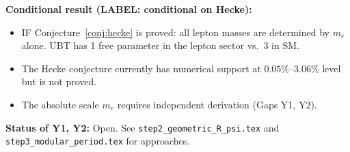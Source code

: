 \documentclass[12pt,a4paper]{article}
\theoremstyle{definition}
\theoremstyle{remark}
\begin{document}
\begin{resultbox}
\textbf{Conditional result (LABEL: conditional on Hecke):}
\begin{itemize}
  \item IF Conjecture~\ref{conj:hecke} is proved:
        all lepton masses are determined by $m_e$ alone.
        UBT has 1 free parameter in the lepton sector vs.\ 3 in SM.
  \item The Hecke conjecture currently has numerical support at $0.05\%$--$3.06\%$
        level but is not proved.
  \item The absolute scale $m_e$ requires independent derivation (Gaps Y1, Y2).
\end{itemize}

\textbf{Status of Y1, Y2:} Open.  See
\texttt{step2\_geometric\_R\_psi.tex} and
\texttt{step3\_modular\_period.tex} for approaches.
\end{resultbox}

\ifdefined\INCLUDEMODE
\else
  
\end{document}
